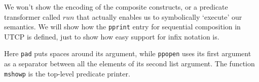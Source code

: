 We won't show the encoding of the composite constructs,
or a predicate transformer called $run$ that actually
enables us to symbolically `execute' our semantics.
We will show how the \texttt{pprint} entry for
sequential composition in UTCP is defined,
just to show how easy support for infix notation is.
Here \texttt{pad} puts spaces around its argument,
while \texttt{ppopen} uses its first argument as a
separator between all the elements of its second list argument.
The function \texttt{mshowp} is the top-level predicate printer.
